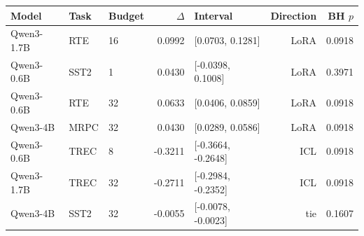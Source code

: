 \begin{tabular}{lllrlrr}
\toprule
Model & Task & Budget & $\Delta$ & Interval & Direction & BH $p$ \\
\midrule
Qwen3-1.7B & RTE & 16 & 0.0992 & [0.0703, 0.1281] & LoRA & 0.0918 \\
Qwen3-0.6B & SST2 & 1 & 0.0430 & [-0.0398, 0.1008] & LoRA & 0.3971 \\
Qwen3-0.6B & RTE & 32 & 0.0633 & [0.0406, 0.0859] & LoRA & 0.0918 \\
Qwen3-4B & MRPC & 32 & 0.0430 & [0.0289, 0.0586] & LoRA & 0.0918 \\
Qwen3-0.6B & TREC & 8 & -0.3211 & [-0.3664, -0.2648] & ICL & 0.0918 \\
Qwen3-1.7B & TREC & 32 & -0.2711 & [-0.2984, -0.2352] & ICL & 0.0918 \\
Qwen3-4B & SST2 & 32 & -0.0055 & [-0.0078, -0.0023] & tie & 0.1607 \\
\bottomrule
\end{tabular}
